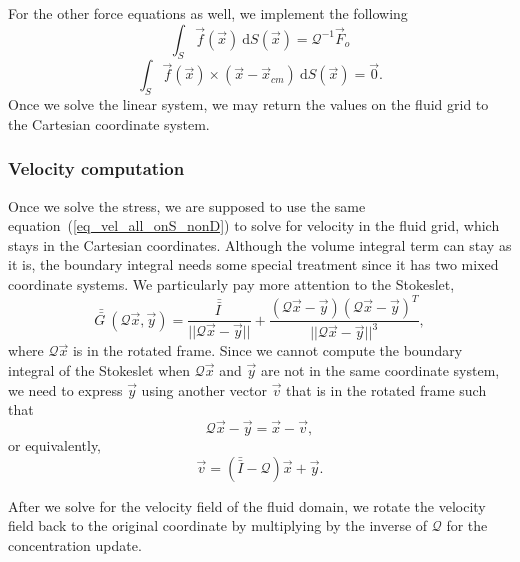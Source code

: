For the other force equations as well, we implement the following
\begin{equation}
	\int_{S} \vec{f}(\vec{x}) \  \text{d}S(\vec{x})
	= \mathcal{Q}^{-1} \vec{F}_o
	 \label{eq_drag_code}
	 \end{equation} 
	 \begin{equation}
		 \int_S \vec{f} (\vec{x})  \times (\vec{x} - \vec{x}_{cm}) 
		 \ \textrm{d}S(\vec{x}) 
		 = \vec{0}.
	 \label{eq_torque_code}
	 \end{equation}
Once we solve the linear system, we may return the values on the fluid grid to the Cartesian coordinate system.

\subsubsection{Velocity computation}
Once we solve the stress, we are supposed to use the same 
equation~(\ref{eq_vel_all_onS_nonD}) 
to solve for velocity in the fluid grid, which stays in the Cartesian coordinates.
Although the volume integral term can stay as it is,  
the boundary integral needs some special treatment
since it has two mixed coordinate systems.
We particularly pay more attention to the Stokeslet,
\[
	\bar{\bar{G \ }} (\mathcal{Q}\vec{x},\vec{y}) 
	= 
	\frac{\bar{\bar{I \ }}}{||\mathcal{Q}\vec{x}-\vec{y} ||} 
	+ \frac{(\mathcal{Q}\vec{x}-\vec{y})(\mathcal{Q}\vec{x}-\vec{y})^T}{||\mathcal{Q}\vec{x}-\vec{y} ||^3}, 	 
\]
where $\mathcal{Q}\vec{x}$ is in the rotated frame. Since we cannot compute the boundary integral of the Stokeslet when $\mathcal{Q}\vec{x}$ and $\vec{y}$ are not in the same coordinate system, we need to express $\vec{y}$ using another vector $\vec{v}$ that is in the rotated frame such that 
\[
	\mathcal{Q}\vec{x} - \vec{y} = \vec{x} - \vec{v},
\]
or equivalently,
\[
	\vec{v} = \left(   \bar{\bar{I}} - \mathcal{Q} \right) \vec{x}  + \vec{y}.
\]


After we solve for the velocity field of the fluid domain, we rotate the velocity field back to the original coordinate by multiplying by the inverse of $\mathcal{Q}$ for the concentration update. 
